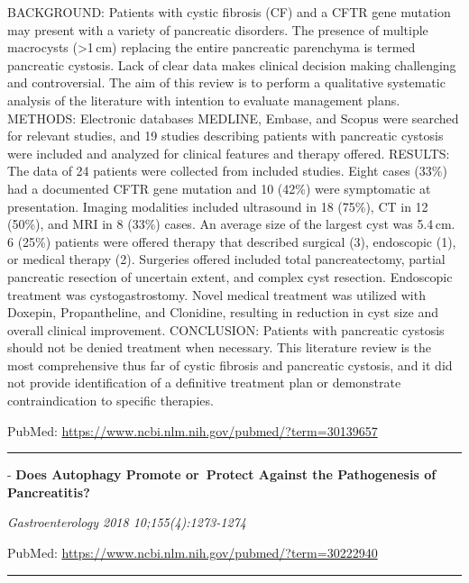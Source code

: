 \documentclass[]{article}
\begin{document}
BACKGROUND: Patients with cystic fibrosis (CF) and a CFTR gene mutation
may present with a variety of pancreatic disorders. The presence of
multiple macrocysts (\textgreater{}1\,cm) replacing the entire
pancreatic parenchyma is termed pancreatic cystosis. Lack of clear data
makes clinical decision making challenging and controversial. The aim of
this review is to perform a qualitative systematic analysis of the
literature with intention to evaluate management plans. METHODS:
Electronic databases MEDLINE, Embase, and Scopus were searched for
relevant studies, and 19 studies describing patients with pancreatic
cystosis were included and analyzed for clinical features and therapy
offered. RESULTS: The data of 24 patients were collected from included
studies. Eight cases (33\%) had a documented CFTR gene mutation and 10
(42\%) were symptomatic at presentation. Imaging modalities included
ultrasound in 18 (75\%), CT in 12 (50\%), and MRI in 8 (33\%) cases. An
average size of the largest cyst was 5.4\,cm. 6 (25\%) patients were
offered therapy that described surgical (3), endoscopic (1), or medical
therapy (2). Surgeries offered included total pancreatectomy, partial
pancreatic resection of uncertain extent, and complex cyst resection.
Endoscopic treatment was cystogastrostomy. Novel medical treatment was
utilized with Doxepin, Propantheline, and Clonidine, resulting in
reduction in cyst size and overall clinical improvement. CONCLUSION:
Patients with pancreatic cystosis should not be denied treatment when
necessary. This literature review is the most comprehensive thus far of
cystic fibrosis and pancreatic cystosis, and it did not provide
identification of a definitive treatment plan or demonstrate
contraindication to specific therapies.

PubMed: \url{https://www.ncbi.nlm.nih.gov/pubmed/?term=30139657}

{}

{}

\begin{center}\rule{0.5\linewidth}{\linethickness}\end{center}

 - \textbf{Does Autophagy Promote or~Protect Against the Pathogenesis of
Pancreatitis?}

\emph{Gastroenterology 2018 10;155(4):1273-1274}

PubMed: \url{https://www.ncbi.nlm.nih.gov/pubmed/?term=30222940}

{}

{}

\begin{center}\rule{0.5\linewidth}{\linethickness}\end{center}
\end{document}
